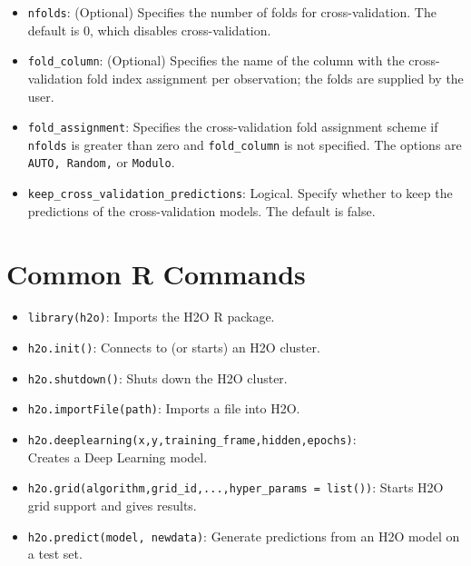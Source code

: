 {{{\begin{itemize}
\item \texttt{nfolds}: (Optional) Specifies the number of folds for cross-validation. %
The default is 0, which disables cross-validation.

\item \texttt{fold\_column}: (Optional) Specifies the name of the column with the cross-validation fold index assignment per observation; the folds are supplied by the user. 

\item \texttt{fold\_assignment}: Specifies the cross-validation fold assignment scheme if \texttt{nfolds} is greater than zero and \texttt{fold\_column} is not specified. The options are \texttt{AUTO, Random,} or \texttt{Modulo}. 

\item \texttt{keep\_cross\_validation\_predictions}: Logical.  Specify whether to keep the predictions of the cross-validation models.  The default is false.

\end{itemize}

\section{Common R Commands}
\begin{itemize}

\item \texttt{library(h2o)}: Imports the H2O R package.

\item \texttt{h2o.init()}:  Connects to (or starts) an H2O cluster.

\item \texttt{h2o.shutdown()}: Shuts down the H2O cluster.

\item \texttt{h2o.importFile(path)}: Imports a file into H2O.

\item \texttt{h2o.deeplearning(x,y,training\_frame,hidden,epochs)}:\\ Creates a Deep Learning model.

\item \texttt{h2o.grid(algorithm,grid\_id,...,hyper\_params = list())}: Starts H2O grid support and gives results.

\item \texttt{h2o.predict(model, newdata)}: Generate predictions from an H2O model on a test set.


\end{itemize}}}}

